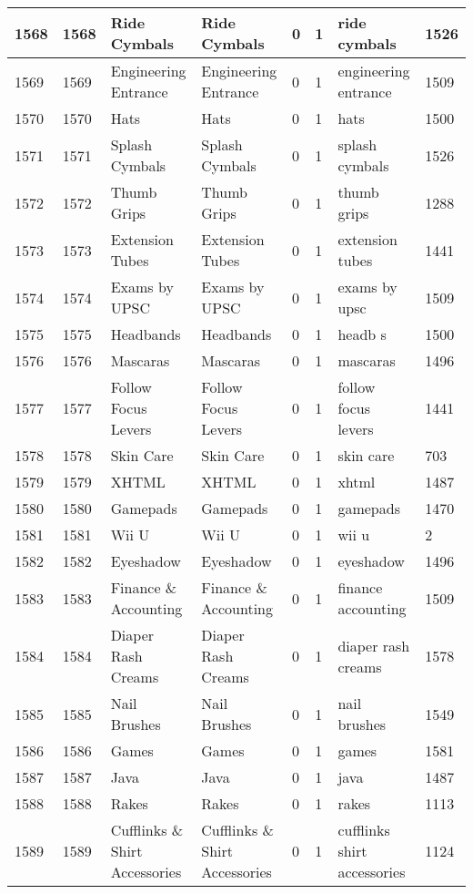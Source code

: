 \begin{longtable}{|l|l|l|l|l|l|l|l|}
1568 & 1568 & Ride Cymbals & Ride Cymbals & 0 & 1 & ride cymbals & 1526 \\ \hline 
1569 & 1569 & Engineering Entrance & Engineering Entrance & 0 & 1 & engineering entrance & 1509 \\ \hline 
1570 & 1570 & Hats & Hats & 0 & 1 & hats & 1500 \\ \hline 
1571 & 1571 & Splash Cymbals & Splash Cymbals & 0 & 1 & splash cymbals & 1526 \\ \hline 
1572 & 1572 & Thumb Grips & Thumb Grips & 0 & 1 & thumb grips & 1288 \\ \hline 
1573 & 1573 & Extension Tubes & Extension Tubes & 0 & 1 & extension tubes & 1441 \\ \hline 
1574 & 1574 & Exams by UPSC & Exams by UPSC & 0 & 1 & exams by upsc & 1509 \\ \hline 
1575 & 1575 & Headbands & Headbands & 0 & 1 & headb s & 1500 \\ \hline 
1576 & 1576 & Mascaras & Mascaras & 0 & 1 & mascaras & 1496 \\ \hline 
1577 & 1577 & Follow Focus Levers & Follow Focus Levers & 0 & 1 & follow focus levers & 1441 \\ \hline 
1578 & 1578 & Skin Care & Skin Care & 0 & 1 & skin care & 703 \\ \hline 
1579 & 1579 & XHTML & XHTML & 0 & 1 & xhtml & 1487 \\ \hline 
1580 & 1580 & Gamepads & Gamepads & 0 & 1 & gamepads & 1470 \\ \hline 
1581 & 1581 & Wii U & Wii U & 0 & 1 & wii u & 2 \\ \hline 
1582 & 1582 & Eyeshadow & Eyeshadow & 0 & 1 & eyeshadow & 1496 \\ \hline 
1583 & 1583 & Finance \& Accounting & Finance \& Accounting & 0 & 1 & finance accounting & 1509 \\ \hline 
1584 & 1584 & Diaper Rash Creams & Diaper Rash Creams & 0 & 1 & diaper rash creams & 1578 \\ \hline 
1585 & 1585 & Nail Brushes & Nail Brushes & 0 & 1 & nail brushes & 1549 \\ \hline 
1586 & 1586 & Games & Games & 0 & 1 & games & 1581 \\ \hline 
1587 & 1587 & Java & Java & 0 & 1 & java & 1487 \\ \hline 
1588 & 1588 & Rakes & Rakes & 0 & 1 & rakes & 1113 \\ \hline 
1589 & 1589 & Cufflinks \& Shirt Accessories & Cufflinks \& Shirt Accessories & 0 & 1 & cufflinks shirt accessories & 1124 \\ \hline 

\end{longtable}
